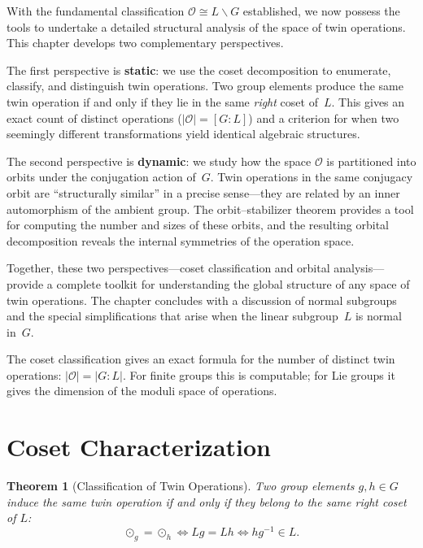 \documentclass[11pt,a4paper,openany]{book}
\theoremstyle{plain}
\newtheorem{theorem}{Theorem}[chapter]
\theoremstyle{definition}
\newcommand{\twing}[1]{\odot_{#1}}
\newcommand{\opspace}{\mathcal{O}}
\newcommand{\lingroup}{L}
\newcommand{\groupG}{G}
\begin{document}
With the fundamental classification $\opspace \cong \lingroup\backslash\groupG$ established, we now possess the tools to undertake a detailed structural analysis of the space of twin operations. This chapter develops two complementary perspectives.

The first perspective is \textbf{static}: we use the coset decomposition to enumerate, classify, and distinguish twin operations. Two group elements produce the same twin operation if and only if they lie in the same \emph{right} coset of~$\lingroup$. This gives an exact count of distinct operations ($|\opspace| = [\groupG : \lingroup]$) and a criterion for when two seemingly different transformations yield identical algebraic structures.

The second perspective is \textbf{dynamic}: we study how the space $\opspace$ is partitioned into orbits under the conjugation action of~$\groupG$. Twin operations in the same conjugacy orbit are ``structurally similar'' in a precise sense---they are related by an inner automorphism of the ambient group. The orbit--stabilizer theorem provides a tool for computing the number and sizes of these orbits, and the resulting orbital decomposition reveals the internal symmetries of the operation space.

Together, these two perspectives---coset classification and orbital analysis---provide a complete toolkit for understanding the global structure of any space of twin operations. The chapter concludes with a discussion of normal subgroups and the special simplifications that arise when the linear subgroup~$\lingroup$ is normal in~$\groupG$.

\begin{applicationbox}
The coset classification gives an exact formula for the number of distinct twin operations: $|\opspace| = |\groupG : \lingroup|$. For finite groups this is computable; for Lie groups it gives the dimension of the moduli space of operations.
\end{applicationbox}

\section{Coset Characterization}

\begin{theorem}[Classification of Twin Operations]\label{thm:classification}
Two group elements $g, h \in \groupG$ induce the same twin operation if and only if they belong to the same \emph{right} coset of $\lingroup$:
\[
\twing{g} = \twing{h} \iff \lingroup g = \lingroup h \iff hg^{-1}\in\lingroup .
\]
\end{theorem}
\end{document}

